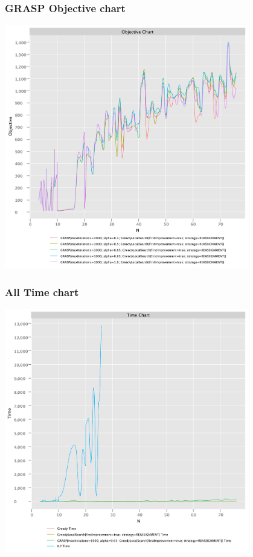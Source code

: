 \documentclass{beamer}
\begin{document}
\begin{frame}
\frametitle{GRASP Objective chart}
\includegraphics[width=0.8\textwidth]{./documentation/assets/new.GRASPParams.objectiveChart.pdf}
\end{frame}

\begin{frame}
\frametitle{All Time chart}
\includegraphics[width=0.8\textwidth]{./documentation/assets/new.all.timeChart.pdf}
\end{frame}
\end{document}
